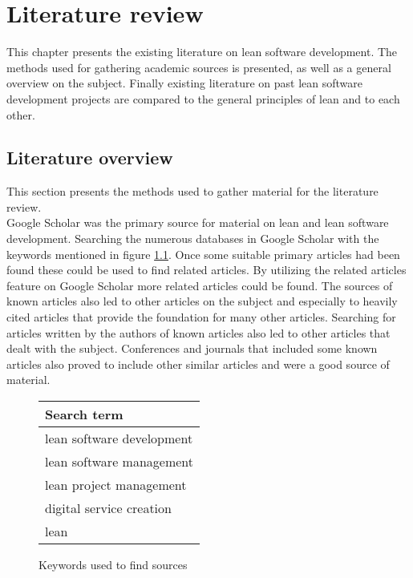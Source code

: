 
\chapter{Literature review}
\label{chapter:litterature}

This chapter presents the existing literature on lean software development. The methods used for gathering academic sources is presented, as well as a general overview on the subject. Finally existing literature on past lean software development projects are compared to the general principles of lean and to each other.

\section{Literature overview}
\label{section:litoverview}

This section presents the methods used to gather material for the literature review.\\

Google Scholar was the primary source for material on lean and lean software development. Searching the numerous databases in Google Scholar with the keywords mentioned in figure \ref{figure:keywords}. Once some suitable primary articles had been found these could be used to find related articles. By utilizing the related articles feature on Google Scholar more related articles could be found. The sources of known articles also led to other articles on the subject and especially to heavily cited articles that provide the foundation for many other articles. Searching for articles written by the authors of known articles also led to other articles that dealt with the subject. Conferences and journals that included some known articles also proved to include other similar articles and were a good source of material.

\begin{figure}[h]
  \label{figure:keywords}
  \begin{center}
    \begin{tabular}{| l |}
      \hline
      Search term \\
      \hline
      lean software development \\
      lean software management \\
      lean project management \\
      digital service creation \\
      lean \\
      \hline
     \end{tabular}
    \caption{Keywords used to find sources}
  \end{center}
\end{figure}


